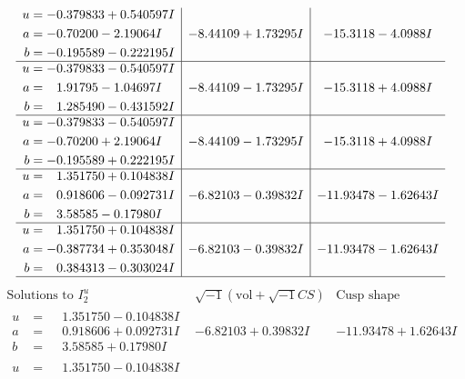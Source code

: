 \documentclass[1p]{elsarticle_modified}
\theoremstyle{definition}
\newcommand{\I}{\sqrt{-1}}
\begin{document}
$$\begin{array}{c|c|c}
\begin{aligned}
u &= -0.379833 + 0.540597 I \\
a &= -0.70200 - 2.19064 I \\
b &= -0.195589 - 0.222195 I\end{aligned}
 & -8.44109 + 1.73295 I & -15.3118 - 4.0988 I \\ \hline\begin{aligned}
u &= -0.379833 - 0.540597 I \\
a &= \phantom{-}1.91795 - 1.04697 I \\
b &= \phantom{-}1.285490 - 0.431592 I\end{aligned}
 & -8.44109 - 1.73295 I & -15.3118 + 4.0988 I \\ \hline\begin{aligned}
u &= -0.379833 - 0.540597 I \\
a &= -0.70200 + 2.19064 I \\
b &= -0.195589 + 0.222195 I\end{aligned}
 & -8.44109 - 1.73295 I & -15.3118 + 4.0988 I \\ \hline\begin{aligned}
u &= \phantom{-}1.351750 + 0.104838 I \\
a &= \phantom{-}0.918606 - 0.092731 I \\
b &= \phantom{-}3.58585 - 0.17980 I\end{aligned}
 & -6.82103 - 0.39832 I & -11.93478 - 1.62643 I \\ \hline\begin{aligned}
u &= \phantom{-}1.351750 + 0.104838 I \\
a &= -0.387734 + 0.353048 I \\
b &= \phantom{-}0.384313 - 0.303024 I\end{aligned}
 & -6.82103 - 0.39832 I & -11.93478 - 1.62643 I\\
 \hline 
 \end{array}$$\newpage$$\begin{array}{c|c|c}  
\text{Solutions to }I^u_{2}& \I (\text{vol} + \sqrt{-1}CS) & \text{Cusp shape}\\
 \hline 
\begin{aligned}
u &= \phantom{-}1.351750 - 0.104838 I \\
a &= \phantom{-}0.918606 + 0.092731 I \\
b &= \phantom{-}3.58585 + 0.17980 I\end{aligned}
 & -6.82103 + 0.39832 I & -11.93478 + 1.62643 I \\ \hline\begin{aligned}
u &= \phantom{-}1.351750 - 0.104838 I \\

\end{aligned}
\end{array}$$
\end{document}
